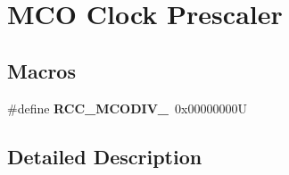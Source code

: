 \hypertarget{group___r_c_c___m_c_ox___clock___prescaler}{}\section{M\+CO Clock Prescaler}
\label{group___r_c_c___m_c_ox___clock___prescaler}
\subsection*{Macros}
\begin{DoxyCompactItemize}
\item 
\mbox{\label{group___r_c_c___m_c_ox___clock___prescaler_ga438d8c3bead4e1ec5dd5757cb0313d53}} 
\#define {\bfseries R\+C\+C\+\_\+\+M\+C\+O\+D\+I\+V\+\_}~0x00000000U
\end{DoxyCompactItemize}


\subsection{Detailed Description}
